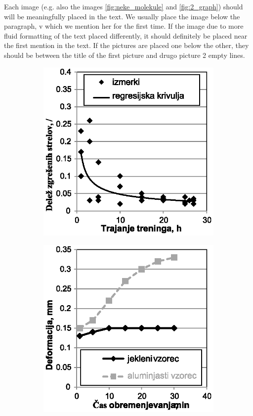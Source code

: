 Each image (e.g. also the images \ref{fig:neke_molekule} and \ref{fig:2_graph}) should
will be meaningfully placed in the text. We usually place the image below the paragraph, v
which we mention her for the first time. If the image due to more fluid formatting of the text
placed differently, it should definitely be placed near the first mention in the text. If
the pictures are placed one below the other, they should be between the title of the first picture and drugo
picture 2 empty lines.

\begin{figure}
\begin{subfigure}[b]{.45\linewidth}
\centering \includegraphics[scale=0.7]{figures/graf_1}
\caption{}\label{subfig:graph1}
\end{subfigure}%
\quad
\begin{subfigure}[b]{.45\linewidth}
\centering \includegraphics[scale=0.7]{figures/graf_2}

\end{subfigure}
\end{figure}
